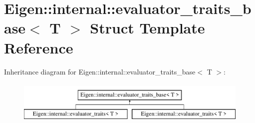 \hypertarget{struct_eigen_1_1internal_1_1evaluator__traits__base}{}\section{Eigen\+:\+:internal\+:\+:evaluator\+\_\+traits\+\_\+base$<$ T $>$ Struct Template Reference}
\label{struct_eigen_1_1internal_1_1evaluator__traits__base}
Inheritance diagram for Eigen\+:\+:internal\+:\+:evaluator\+\_\+traits\+\_\+base$<$ T $>$\+:\begin{figure}[H]
\begin{center}
\leavevmode
\includegraphics[height=2.000000cm]{struct_eigen_1_1internal_1_1evaluator__traits__base}
\end{center}
\end{figure}
